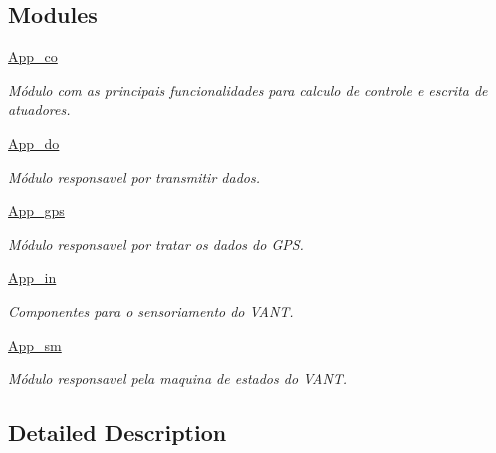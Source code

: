 \subsection*{Modules}
\begin{DoxyCompactItemize}
\item 
\hyperlink{group__app__co}{App\+\_\+co}
\begin{DoxyCompactList}\small\item\em Módulo com as principais funcionalidades para calculo de controle e escrita de atuadores. \end{DoxyCompactList}\item 
\hyperlink{group__app__do}{App\+\_\+do}
\begin{DoxyCompactList}\small\item\em Módulo responsavel por transmitir dados. \end{DoxyCompactList}\item 
\hyperlink{group__app__gps}{App\+\_\+gps}
\begin{DoxyCompactList}\small\item\em Módulo responsavel por tratar os dados do G\+PS. \end{DoxyCompactList}\item 
\hyperlink{group__app__in}{App\+\_\+in}
\begin{DoxyCompactList}\small\item\em Componentes para o sensoriamento do V\+A\+NT. \end{DoxyCompactList}\item 
\hyperlink{group__app__sm}{App\+\_\+sm}
\begin{DoxyCompactList}\small\item\em Módulo responsavel pela maquina de estados do V\+A\+NT. \end{DoxyCompactList}\end{DoxyCompactItemize}


\subsection{Detailed Description}
